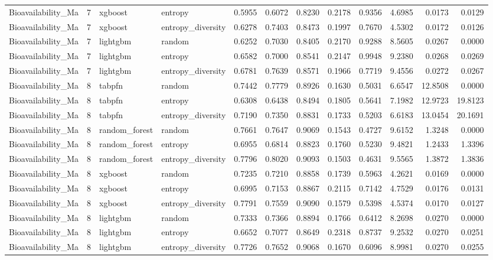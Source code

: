 \begin{tabular}{lrllrrrrrrrr}
Bioavailability_Ma & 7 & xgboost & entropy & 0.5955 & 0.6072 & 0.8230 & 0.2178 & 0.9356 & 4.6985 & 0.0173 & 0.0129 \\
Bioavailability_Ma & 7 & xgboost & entropy_diversity & 0.6278 & 0.7403 & 0.8473 & 0.1997 & 0.7670 & 4.5302 & 0.0172 & 0.0126 \\
Bioavailability_Ma & 7 & lightgbm & random & 0.6252 & 0.7030 & 0.8405 & 0.2170 & 0.9288 & 8.5605 & 0.0267 & 0.0000 \\
Bioavailability_Ma & 7 & lightgbm & entropy & 0.6582 & 0.7000 & 0.8541 & 0.2147 & 0.9948 & 9.2380 & 0.0268 & 0.0269 \\
Bioavailability_Ma & 7 & lightgbm & entropy_diversity & 0.6781 & 0.7639 & 0.8571 & 0.1966 & 0.7719 & 9.4556 & 0.0272 & 0.0267 \\
Bioavailability_Ma & 8 & tabpfn & random & 0.7442 & 0.7779 & 0.8926 & 0.1630 & 0.5031 & 6.6547 & 12.8508 & 0.0000 \\
Bioavailability_Ma & 8 & tabpfn & entropy & 0.6308 & 0.6438 & 0.8494 & 0.1805 & 0.5641 & 7.1982 & 12.9723 & 19.8123 \\
Bioavailability_Ma & 8 & tabpfn & entropy_diversity & 0.7190 & 0.7350 & 0.8831 & 0.1733 & 0.5203 & 6.6183 & 13.0454 & 20.1691 \\
Bioavailability_Ma & 8 & random_forest & random & 0.7661 & 0.7647 & 0.9069 & 0.1543 & 0.4727 & 9.6152 & 1.3248 & 0.0000 \\
Bioavailability_Ma & 8 & random_forest & entropy & 0.6955 & 0.6814 & 0.8823 & 0.1760 & 0.5230 & 9.4821 & 1.2433 & 1.3396 \\
Bioavailability_Ma & 8 & random_forest & entropy_diversity & 0.7796 & 0.8020 & 0.9093 & 0.1503 & 0.4631 & 9.5565 & 1.3872 & 1.3836 \\
Bioavailability_Ma & 8 & xgboost & random & 0.7235 & 0.7210 & 0.8858 & 0.1739 & 0.5963 & 4.2621 & 0.0169 & 0.0000 \\
Bioavailability_Ma & 8 & xgboost & entropy & 0.6995 & 0.7153 & 0.8867 & 0.2115 & 0.7142 & 4.7529 & 0.0176 & 0.0131 \\
Bioavailability_Ma & 8 & xgboost & entropy_diversity & 0.7791 & 0.7559 & 0.9090 & 0.1579 & 0.5398 & 4.5374 & 0.0170 & 0.0127 \\
Bioavailability_Ma & 8 & lightgbm & random & 0.7333 & 0.7366 & 0.8894 & 0.1766 & 0.6412 & 8.2698 & 0.0270 & 0.0000 \\
Bioavailability_Ma & 8 & lightgbm & entropy & 0.6652 & 0.7077 & 0.8649 & 0.2318 & 0.8737 & 9.2532 & 0.0270 & 0.0251 \\
Bioavailability_Ma & 8 & lightgbm & entropy_diversity & 0.7726 & 0.7652 & 0.9068 & 0.1670 & 0.6096 & 8.9981 & 0.0270 & 0.0255 \\

\end{tabular}
